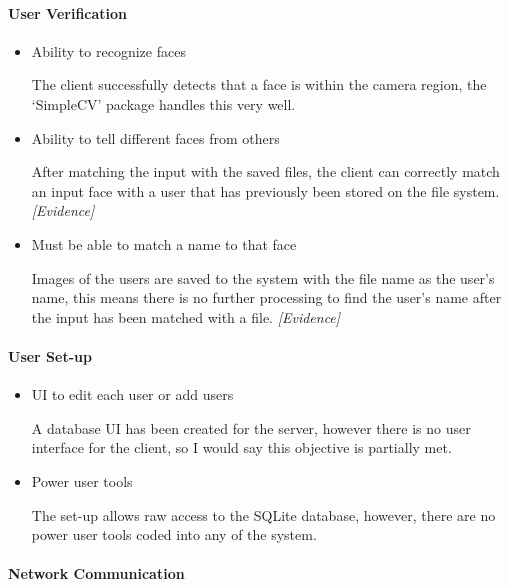 \documentclass[a4paper]{article}
\begin{document}
		\paragraph{User Verification}
			\begin{itemize}
				\item Ability to recognize faces

				The client successfully detects that a face is within the camera region, the `SimpleCV' package
				handles this very well.

				\item Ability to tell different faces from others
				
				After matching the input with the saved files, the client can correctly match an input face with a
				user that has previously been stored on the file system. \textit{[Evidence]}

				\item Must be able to match a name to that face

				Images of the users are saved to the system with the file name as the user's name, this means there is
				no further processing to find the user's name after the input has been matched with a file. \textit{[Evidence]}
			\end{itemize}

		\paragraph{User Set-up}

			\begin{itemize}
				\item UI to edit each user or add users

				A database UI has been created for the server, however there is no user interface for the client, so I would
				say this objective is partially met.
				
				\item Power user tools

				The set-up allows raw access to the SQLite database, however, there are no power user tools coded into any of
				the system.
			\end{itemize}

		\paragraph{Network Communication}
		
\end{document}
